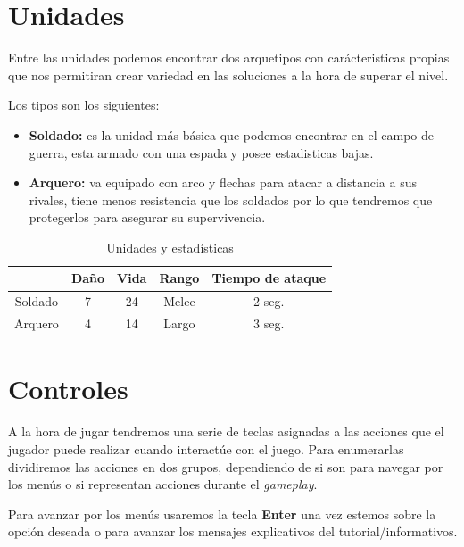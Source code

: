 \section{Unidades}
Entre las unidades podemos encontrar dos arquetipos con carácteristicas propias
que nos permitiran crear variedad en las soluciones a la hora de superar el
nivel.

Los tipos son los siguientes:
\begin{itemize}
	\item \textbf{Soldado:} es la unidad más básica que podemos encontrar en el campo de
							guerra, esta armado con una espada y posee estadisticas
							bajas.
	\item \textbf{Arquero:} va equipado con arco y flechas para atacar a distancia a
							sus rivales, tiene menos resistencia que los soldados por
							lo que tendremos que protegerlos para asegurar su
							supervivencia.
\end{itemize}

\begin{table}[ht]
\begin{center}
\begin{tabular}{|c|c|c|c|c|}
\hline
        & Daño & Vida  & Rango  & Tiempo de ataque \\ 
\hline
\hline
Soldado & 7    & 24    & Melee & 2 seg.\\ 
\hline
Arquero & 4    & 14    & Largo & 3 seg.\\ 
\hline
\end{tabular}
\caption{Unidades y estadísticas}
\end{center}
\end{table}

\section{Controles}
A la hora de jugar tendremos una serie de teclas asignadas a las acciones que el
jugador puede realizar cuando interactúe con el juego. Para enumerarlas dividiremos las
acciones en dos grupos, dependiendo de si son para navegar por los menús o si
representan acciones durante el \textit{gameplay}.

Para avanzar por los menús usaremos la tecla \textbf{Enter} una vez estemos sobre la opción deseada o
para avanzar los mensajes explicativos del tutorial/informativos.

